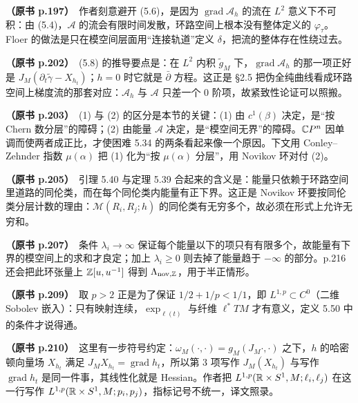 \noindent \textbf{（原书 p.197）}\ 作者刻意避开 (5.6)，是因为 $\operatorname{grad}\mathcal{A}_h$ 的流在 $L^2$ 意义下不可积：由 (5.4)，$\mathcal{A}$ 的流会有限时间发散，环路空间上根本没有整体定义的 $\varphi_\tau$。Floer 的做法是只在模空间层面用“连接轨道”定义 $\delta$，把流的整体存在性绕过去。\par\smallskip

\noindent \textbf{（原书 p.202）}\ (5.8) 的推导要点是：在 $L^2$ 内积 $\tilde g_M$ 下，$\operatorname{grad}\mathcal{A}_h$ 的那一项正好是 $J_M(\partial_t\tilde\gamma-X_{h_t})$；$h=0$ 时它就是 $\bar\partial$ 方程。这正是 §2.5 把伪全纯曲线看成环路空间上梯度流的那套对应：$\mathcal{A}_h$ 与 $\mathcal{A}$ 只差一个 0 阶项，故紧致性论证可以照搬。\par\smallskip

\noindent \textbf{（原书 p.203）}\ (1) 与 (2) 的区分是本节的关键：(1) 由 $c^1(\beta)$ 决定，是“按 Chern 数分层”的障碍；(2) 由能量 $\mathcal{A}$ 决定，是“模空间无界”的障碍。$\mathbb{C}P^n$ 因单调而使两者成正比，才使困难 5.34 的两条看起来像一个原因。下文用 Conley–Zehnder 指数 $\mu(\alpha)$ 把 (1) 化为“按 $\mu(\alpha)$ 分层”，用 Novikov 环对付 (2)。\par\smallskip

\noindent \textbf{（原书 p.205）}\ 引理 5.40 与定理 5.39 合起来的含义是：能量只依赖于环路空间里道路的同伦类，而在每个同伦类内能量有正下界。这正是 Novikov 环要按同伦类分层计数的理由：$\mathcal{M}(R_i,R_j;h)$ 的同伦类有无穷多个，故必须在形式上允许无穷和。\par\smallskip

\noindent \textbf{（原书 p.207）}\ 条件 $\lambda_i\to\infty$ 保证每个能量以下的项只有有限多个，故能量有下界的模空间上的求和才良定；加上 $\lambda_i\ge0$ 则去掉了能量趋于 $-\infty$ 的部分。p.216 还会把此环张量上 $\mathbb{Z}[u,u^{-1}]$ 得到 $\Lambda_{\mathrm{nov},\mathbb{Z}}$，用于半正情形。\par\smallskip

\noindent \textbf{（原书 p.209）}\ 取 $p>2$ 正是为了保证 $1/2+1/p<1/1$，即 $L^{1,p}\subset C^0$（二维 Sobolev 嵌入）：只有映射连续，$\exp_{\ell(t)}$ 与纤维 $\ell^*TM$ 才有意义，定义 5.50 中的条件才说得通。\par\smallskip

\noindent \textbf{（原书 p.210）}\ 这里有一步符号约定：$\omega_M(\cdot,\cdot)=g_M(J_M\cdot,\cdot)$ 之下，$h$ 的哈密顿向量场 $X_{h_t}$ 满足 $J_MX_{h_t}=\operatorname{grad}h_t$，所以第 3 项写作 $J_M(X_{h_t})$ 与写作 $\operatorname{grad}h_t$ 是同一件事，其线性化就是 Hessian。作者把 $L^{1,p}(\mathbb{R}\times S^1,M;\ell_i,\ell_j)$ 在这一行写作 $L^{1,p}(\mathbb{R}\times S^1,M;p_i,p_j)$，指标记号不统一，译文照录。\par\smallskip


